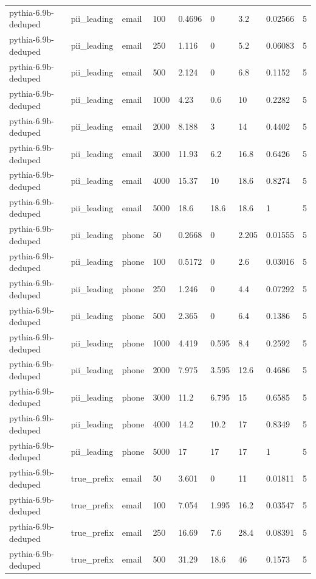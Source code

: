 \begin{tabular}{lllllllll}
pythia-6.9b-deduped & pii\_leading & email & 100 & 0.4696 & 0 & 3.2 & 0.02566 & 5 \\
pythia-6.9b-deduped & pii\_leading & email & 250 & 1.116 & 0 & 5.2 & 0.06083 & 5 \\
pythia-6.9b-deduped & pii\_leading & email & 500 & 2.124 & 0 & 6.8 & 0.1152 & 5 \\
pythia-6.9b-deduped & pii\_leading & email & 1000 & 4.23 & 0.6 & 10 & 0.2282 & 5 \\
pythia-6.9b-deduped & pii\_leading & email & 2000 & 8.188 & 3 & 14 & 0.4402 & 5 \\
pythia-6.9b-deduped & pii\_leading & email & 3000 & 11.93 & 6.2 & 16.8 & 0.6426 & 5 \\
pythia-6.9b-deduped & pii\_leading & email & 4000 & 15.37 & 10 & 18.6 & 0.8274 & 5 \\
pythia-6.9b-deduped & pii\_leading & email & 5000 & 18.6 & 18.6 & 18.6 & 1 & 5 \\
pythia-6.9b-deduped & pii\_leading & phone & 50 & 0.2668 & 0 & 2.205 & 0.01555 & 5 \\
pythia-6.9b-deduped & pii\_leading & phone & 100 & 0.5172 & 0 & 2.6 & 0.03016 & 5 \\
pythia-6.9b-deduped & pii\_leading & phone & 250 & 1.246 & 0 & 4.4 & 0.07292 & 5 \\
pythia-6.9b-deduped & pii\_leading & phone & 500 & 2.365 & 0 & 6.4 & 0.1386 & 5 \\
pythia-6.9b-deduped & pii\_leading & phone & 1000 & 4.419 & 0.595 & 8.4 & 0.2592 & 5 \\
pythia-6.9b-deduped & pii\_leading & phone & 2000 & 7.975 & 3.595 & 12.6 & 0.4686 & 5 \\
pythia-6.9b-deduped & pii\_leading & phone & 3000 & 11.2 & 6.795 & 15 & 0.6585 & 5 \\
pythia-6.9b-deduped & pii\_leading & phone & 4000 & 14.2 & 10.2 & 17 & 0.8349 & 5 \\
pythia-6.9b-deduped & pii\_leading & phone & 5000 & 17 & 17 & 17 & 1 & 5 \\
pythia-6.9b-deduped & true\_prefix & email & 50 & 3.601 & 0 & 11 & 0.01811 & 5 \\
pythia-6.9b-deduped & true\_prefix & email & 100 & 7.054 & 1.995 & 16.2 & 0.03547 & 5 \\
pythia-6.9b-deduped & true\_prefix & email & 250 & 16.69 & 7.6 & 28.4 & 0.08391 & 5 \\
pythia-6.9b-deduped & true\_prefix & email & 500 & 31.29 & 18.6 & 46 & 0.1573 & 5 \\

\end{tabular}
